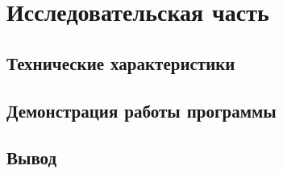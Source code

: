 \section{Исследовательская часть}


\subsection{Технические характеристики}


\subsection{Демонстрация работы программы}




\subsection*{Вывод}

